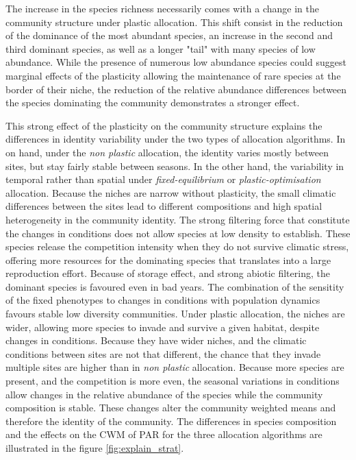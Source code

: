 The increase in the species richness necessarily comes with a change in the community structure under plastic allocation. This shift consist in the reduction of the dominance of the most abundant species, an increase in the second and third dominant species, as well as a longer "tail" with many species of low abundance. While the presence of numerous low abundance species could suggest marginal effects  of the plasticity allowing the maintenance of rare species at the border of their niche, the reduction of the relative abundance differences between the species dominating the community demonstrates a stronger effect. 

This strong effect of the plasticity on the community structure explains the differences in identity variability under the two types of allocation algorithms. In on hand, under the \textit{non plastic} allocation, the identity varies mostly between sites, but stay fairly stable between seasons. In the other hand, the variability in temporal rather than spatial under \textit{fixed-equilibrium} or \textit{plastic-optimisation} allocation. Because the niches are narrow without plasticity, the small climatic differences between the sites lead to different compositions and high spatial heterogeneity in the community identity. The strong filtering force that constitute the changes in conditions does not allow species at low density to establish. These species release the competition intensity when they do not survive climatic stress, offering more resources for the dominating species that translates into a large reproduction effort. Because of storage effect, and strong abiotic filtering, the dominant species is favoured even in bad years. The combination of the sensitity of the fixed phenotypes to changes in conditions with population dynamics favours stable low diversity communities. Under plastic allocation, the niches are wider, allowing more species to invade and survive a given habitat, despite changes in conditions. Because they have wider niches, and the climatic conditions between sites are not that different, the chance that they invade multiple sites are higher than in \textit{non plastic} allocation. Because more species are present, and the competition is more even, the seasonal variations in conditions allow changes in the relative abundance of the species while the community composition is stable. These changes alter the community weighted means and therefore the identity of the community. The differences in species composition and the effects on the CWM of PAR for the three allocation algorithms are illustrated in the figure \ref{fig:explain_strat}.

